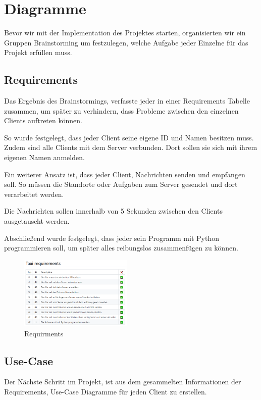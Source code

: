 \section{Diagramme}


Bevor wir mit der Implementation des Projektes starten, 
organisierten wir ein Gruppen Brainstorming um festzulegen, 
welche Aufgabe jeder Einzelne für das Projekt erfüllen muss. 


\subsection{Requirements}

Das Ergebnis des Brainstormings, verfasste jeder in einer Requirements Tabelle zusammen, um später zu verhindern, dass Probleme zwischen den einzelnen Clients auftreten können.

So wurde festgelegt, dass jeder Client seine eigene ID und Namen besitzen muss. 
Zudem sind alle Clients mit dem Server verbunden. 
Dort sollen sie sich mit ihrem eigenen Namen anmelden.

Ein weiterer Ansatz ist, dass jeder Client, Nachrichten senden und empfangen soll. 
So müssen die Standorte oder Aufgaben zum Server gesendet und dort verarbeitet werden.

Die Nachrichten sollen innerhalb von 5 Sekunden zwischen den Clients ausgetauscht werden.

Abschließend wurde festgelegt, dass jeder sein Programm mit Python programmieren soll, um später alles reibungslos zusammenfügen zu können.


\begin{figure}[htbp] 
  \centering
     \includegraphics[width=0.48\textwidth]{Bsp_requirments.png}
     \caption{Requirments}
\end{figure}

\subsection{Use-Case}

Der Nächste Schritt im Projekt, ist aus dem gesammelten Informationen der Requirements, Use-Case Diagramme für jeden Client zu erstellen.

